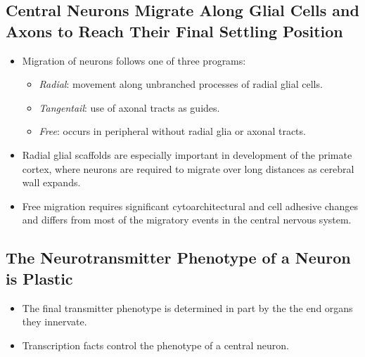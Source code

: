 \documentclass[12pt,a4paper]{article}
\begin{document}
\subsection{Central Neurons Migrate Along Glial Cells and Axons to Reach Their Final Settling Position}
\begin{itemize}
    \item Migration of neurons follows one of three programs:
        \begin{itemize}
            \item \textit{Radial}: movement along unbranched processes of radial glial cells.
            \item \textit{Tangentail}: use of axonal tracts as guides.
            \item \textit{Free}: occurs in peripheral without radial glia or axonal tracts.
        \end{itemize}
    \item Radial glial scaffolds are especially important in development of the primate cortex, where neurons are required to migrate over long distances as cerebral wall expands.
    \item Free migration requires significant cytoarchitectural and cell adhesive changes and differs from most of the migratory events in the central nervous system.
\end{itemize}

\subsection{The Neurotransmitter Phenotype of a Neuron is Plastic}
\begin{itemize}
    \item The final transmitter phenotype is determined in part by the the end organs they innervate.
    \item Transcription facts control the phenotype of a central neuron.
\end{itemize}
\end{document}
